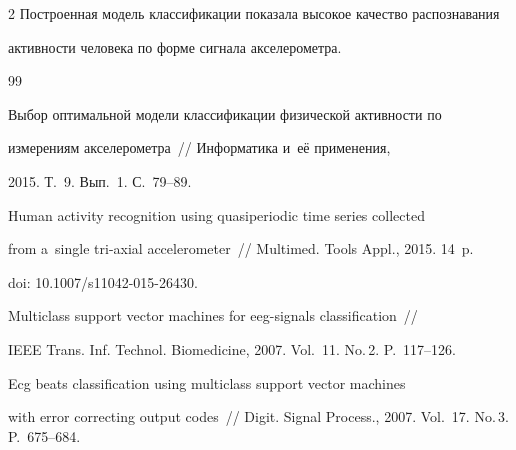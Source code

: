 \begin{multicols}{2}
Построенная модель классификации показала высокое качество распознавания 


активности человека по форме сигнала акселерометра.








{\small\frenchspacing


 {%




 \begin{thebibliography}{99}









Выбор оптимальной модели классификации физической активности по


измерениям акселерометра~// Информатика и~её применения,


2015. Т.~9. Вып.~1. С.~79--89.









Human activity recognition using quasiperiodic time series collected


  from a~single tri-axial accelerometer~// Multimed. Tools  Appl., 2015. 14~p.


  doi: 10.1007/s11042-015-26430.









Multiclass support vector machines for eeg-signals classification~//


IEEE Trans. Inf. Technol. Biomedicine, 2007. Vol.~11. No.\,2. P.~117--126.









Ecg beats classification using multiclass support vector machines


  with error correcting output codes~// Digit. Signal Process., 2007. Vol.~17. No.\,3. P.~675--684.






\end{thebibliography}}}
\end{multicols}
